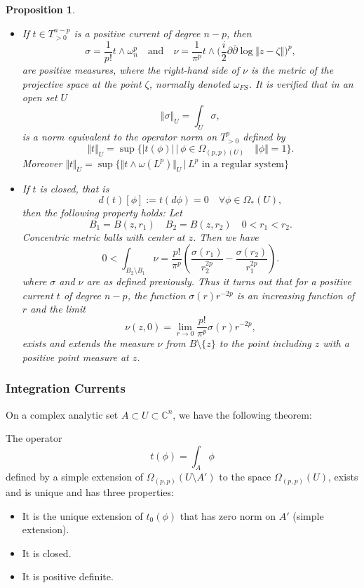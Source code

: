 \documentclass[12pt,twoside,a4paper]{report}
\newtheorem{prop}[theorem]{Proposition}
\begin{document}
\begin{prop}
\begin{itemize}
        \item[4] If $t\in T^{n-p}_{>0}$ is a positive current of degree $n-p$, then
        \[
            \sigma=\frac{1}{p!}t\wedge\omega_n^{p}
            \quad\text{and}\quad
            \nu=\frac{1}{\pi^p}t\wedge\Big(\frac{i}{2}\partial\overline{\partial}\log\Vert z-\zeta\Vert\Big)^{p},
        \]
        are positive measures, where the right-hand side of $\nu$ is the metric of the projective space at the point $\zeta$, normally denoted $\omega_{FS}$. It is verified that in an open set $U$
        \[
            \Vert\sigma\Vert_{U}=\int_{U}\sigma,
        \]
        is a norm equivalent to the operator norm on $T^p_{>0}$ defined by
        \[
            \Vert t\Vert_U=\sup\{|t(\phi)|\,\vert\,\phi\in \Omega_{(p,p)(U)}\quad\Vert\phi\Vert=1\}.
        \]
        Moreover $\Vert t\Vert_U=\sup\{\Vert t\wedge\omega(L^{p})\Vert_U\,\vert\,L^{p}\text{ in a regular system}\}$
        \item[5] If $t$ is closed, that is
        \[
            d(t)[\phi]:=t(d\phi)=0\quad\forall\phi\in\Omega_{*}(U),
        \]
        then the following property holds: Let
        \[
            B_1=B(z,r_1)\quad B_2=B(z,r_2)\quad 0<r_1<r_2.
        \]
        Concentric metric balls with center at $z$. Then we have
        \[
            0<\int_{B_2\setminus B_1}\nu= \frac{p!}{\pi^{p}}(\frac{\sigma(r_1)}{r^{2p}_2}-\frac{\sigma(r_2)}{r^{2p}_1}).
        \]
        where $\sigma$ and $\nu$ are as defined previously. Thus it turns out that for a positive current $t$ of degree $n-p$, the function $\sigma(r)r^{-2p}$ is an increasing function of $r$ and the limit
        \[
            \nu(z,0)=\lim_{r\rightarrow 0}\frac{p!}{\pi^{p}}\sigma(r)r^{-2p},
        \]
        exists and extends the measure $\nu$ from $B\setminus\{z\}$ to the point including $z$ with a positive point measure at $z$.
    \end{itemize}
\end{prop}


\subsubsection{Integration Currents}
\label{sec:org9982aa5}
On a complex analytic set $A\subset U\subset\mathbb{C}^n$, we have the following theorem:

\begin{teorema}
The operator
\[
    t(\phi)=\int_A\phi
\]
defined by a simple extension of $\Omega_{(p,p)}(U\setminus A')$ to the space $\Omega_{(p,p)}(U)$, exists and is unique and has three properties:
\begin{itemize}
    \item[a] It is the unique extension of $t_0(\phi)$ that has zero norm on $A'$ (simple extension).
    \item[b] It is closed.
    \item[c] It is positive definite.
\end{itemize}
\end{teorema}
\end{document}
